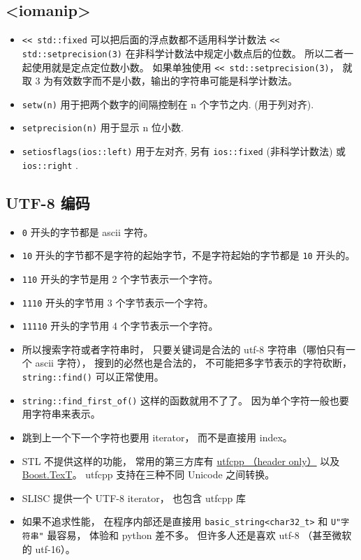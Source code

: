 \subsection{<iomanip>}
\begin{itemize}
\item \verb|<< std::fixed| 可以把后面的浮点数都不适用科学计数法 \verb|<< std::setprecision(3)| 在非科学计数法中规定小数点后的位数。 所以二者一起使用就是定点定位数小数。 如果单独使用 \verb|<< std::setprecision(3)|， 就取 3 为有效数字而不是小数，输出的字符串可能是科学计数法。
\item \verb`setw(n)` 用于把两个数字的间隔控制在 n 个字节之内. (用于列对齐).
\item \verb`setprecision(n)` 用于显示 n 位小数.
\item \verb`setiosflags(ios::left)` 用于左对齐, 另有 \verb`ios::fixed` (非科学计数法) 或 \verb`ios::right` .
\end{itemize}

\subsection{UTF-8 编码}

\begin{itemize}
\item \verb|0| 开头的字节都是 ascii 字符。
\item \verb|10| 开头的字节都不是字符的起始字节，不是字符起始的字节都是 \verb|10| 开头的。
\item \verb|110| 开头的字节是用 2 个字节表示一个字符。
\item \verb|1110| 开头的字节用 3 个字节表示一个字符。
\item \verb|11110| 开头的字节用 4 个字节表示一个字符。
\item 所以搜索字符或者字符串时， 只要关键词是合法的 utf-8 字符串（哪怕只有一个 ascii 字符）， 搜到的必然也是合法的， 不可能把多字节表示的字符砍断， \verb|string::find()| 可以正常使用。
\item \verb|string::find_first_of()| 这样的函数就用不了了。 因为单个字符一般也要用字符串来表示。
\item 跳到上一个下一个字符也要用 iterator， 而不是直接用 index。
\item STL 不提供这样的功能， 常用的第三方库有 \href{https://github.com/nemtrif/utfcpp}{utfcpp （header only）} 以及 \href{https://tzlaine.github.io/text/doc/html/index.html}{Boost.TexT}。 utfcpp 支持在三种不同 Unicode 之间转换。
\item SLISC 提供一个 UTF-8 iterator， 也包含 utfcpp 库
\item 如果不追求性能， 在程序内部还是直接用 \verb|basic_string<char32_t>| 和 \verb|U"字符串"| 最容易， 体验和 python 差不多。 但许多人还是喜欢 utf-8 （甚至微软的 utf-16）。
\end{itemize}

